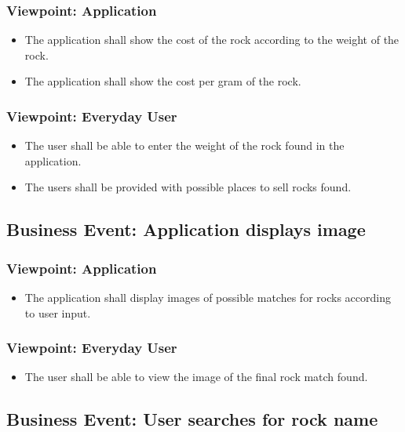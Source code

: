 \documentclass[titlepage]{article}
\begin{document}
\subsubsection{Viewpoint: Application}
\begin{itemize}

  \item The application shall show the cost of the rock according to the weight of the rock. 
  \item The application shall show the cost per gram of the rock.
  \end{itemize}
  \subsubsection{Viewpoint: Everyday User}
  \begin{itemize}
  \item The user shall be able to enter the weight of the rock found in the application.
  \item The users shall be provided with possible places to sell rocks found.
  
\end{itemize}

\subsection{Business Event: Application displays image}
\subsubsection{Viewpoint: Application}
\begin{itemize}
\item The application shall display images of possible matches for rocks according to user input.
\end{itemize}
  \subsubsection{Viewpoint: Everyday User}
  \begin{itemize}
  \item The user shall be able to view the image of the final rock match found.
\end{itemize}


\subsection{Business Event: User searches for rock name}
\end{document}
